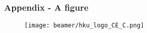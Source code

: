 \begin{frame}[noframenumbering]
\label{Figure}
	\frametitle{Appendix - A figure}
        \hyperlink{Test}{}
        
        \begin{figure}[h!]
            \centering
            \texttt{[image: beamer/hku\_logo\_CE\_C.png]}
        \end{figure}
\end{frame}
